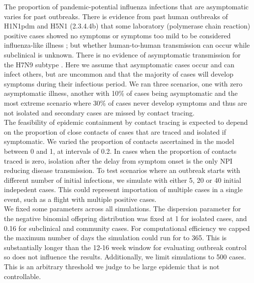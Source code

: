 \documentclass{article}
\begin{document}
The proportion of pandemic-potential influenza infections that are asymptomatic varies for past outbreaks. There is evidence from past human outbreaks of H1N1pdm and H5N1 (2.3.4.4b) that some laboratory (polymerase chain reaction) positive cases showed no symptoms or symptoms too mild to be considered influenza-like illness \citep{lesslerOutbreak2009Pandemic2009, gargHighlyPathogenicAvian2025}; but whether human-to-human transmission can occur while subclinical is unknown. There is no evidence of asymptomatic transmission for the H7N9 subtype \citep{xuSerologicalInvestigationSubclinical2013}. Here we assume that asymptomatic cases occur and can infect others, but are uncommon and that the majority of cases will develop symptoms during their infectious period.  We ran three scenarios, one with zero asymptomatic illness, another with 10\% of cases being asymptomatic and the most extreme scenario where 30\% of cases never develop symptoms and thus are not isolated and secondary cases are missed by contact tracing. \\

The feasibility of epidemic containment by contact tracing is expected to depend on the proportion of close contacts of cases that are traced and isolated if symptomatic. We varied the proportion of contacts ascertained in the model between 0 and 1, at intervals of 0.2. In cases when the proportion of contacts traced is zero, isolation after the delay from symptom onset is the only NPI reducing disease transmission. To test scenarios where an outbreak starts with different number of initial infections, we simulate with either 5, 20 or 40 initial indepedent cases. This could represent importation of multiple cases in a single event, such as a flight with multiple positive cases. \\

We fixed some parameters across all simulations. The dispersion parameter for the negative binomial offspring distribution was fixed at 1 for isolated cases, and 0.16 for subclinical and community cases. For computational efficiency we capped the maximum number of days the simulation could run for to 365. This is substantially longer than the 12-16 week window for evaluating outbreak control so does not influence the results. Additionally, we limit simulations to 500 cases. This is an arbitrary threshold we judge to be large epidemic that is not controllable.
\end{document}
